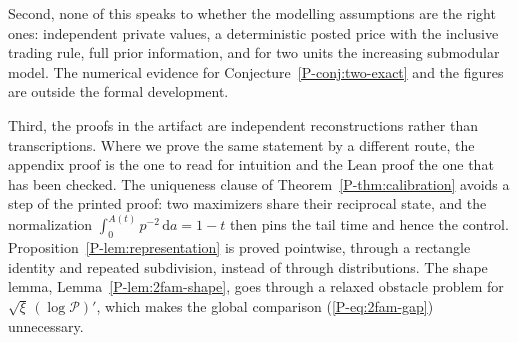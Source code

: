 \documentclass[11pt]{article}
\newcommand{\pref}[1]{\ref*{P-#1}}
\newcommand{\peqref}[1]{(\ref*{P-#1})}
\begin{document}
Second, none of this speaks to whether the modelling assumptions are the
right ones: independent private values, a deterministic posted price with
the inclusive trading rule, full prior information, and for two units the
increasing submodular model. The numerical evidence for
Conjecture~\pref{conj:two-exact} and the figures are outside the formal
development.

Third, the proofs in the artifact are independent reconstructions rather
than transcriptions. Where we prove the same statement by a different
route, the appendix proof is the one to read for intuition and the Lean
proof the one that has been checked. The uniqueness clause of
Theorem~\pref{thm:calibration} avoids a step of the printed proof: two
maximizers share their reciprocal state, and the normalization
$\int_0^{A(t)}p^{-2}\,\mathrm da=1-t$ then pins the tail time and hence the
control. Proposition~\pref{lem:representation} is proved pointwise, through
a rectangle identity and repeated subdivision, instead of through
distributions. The shape lemma, Lemma~\pref{lem:2fam-shape}, goes through a
relaxed obstacle problem for $\sqrt\xi\,(\log\mathcal P)'$, which makes the
global comparison \peqref{eq:2fam-gap} unnecessary.
\end{document}
